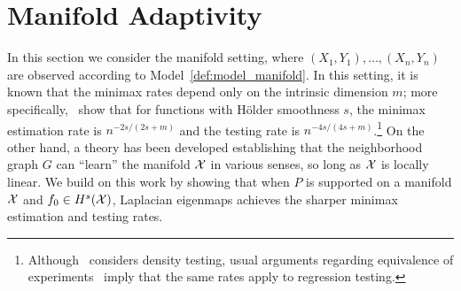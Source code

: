 
\section{Manifold Adaptivity}
\label{sec:manifold_adaptivity}

In this section we consider the manifold setting, where $(X_1,Y_1),\ldots,(X_n,Y_n)$ are observed according to Model~\ref{def:model_manifold}. In this setting, it is known that the minimax rates depend only on the intrinsic dimension $m$; more specifically,~\cite{bickel2007,ariascastro2018} show that for functions with H\"{o}lder smoothness $s$, the minimax estimation rate is $n^{-2s/(2s + m)}$ and the testing rate is $n^{-4s/(4s + m)}$.\footnote{Although~\cite{ariascastro2018} considers density testing, usual arguments regarding equivalence of experiments~\citep{brown96} imply that the same rates apply to regression testing.} On the other hand, a theory has been developed \citep{niyogi2008finding,belkin03,belkin05,niyogi2013,balakrishnan2012minimax,balakrishnan2013cluster} establishing that the neighborhood graph $G$ can ``learn'' the manifold $\mathcal{X}$ in various senses, so long as $\mathcal{X}$ is locally linear.  We build on this work by showing that when $P$ is supported on a manifold $\mathcal{X}$ and $f_0 \in H^s(\mathcal{X})$, Laplacian eigenmaps achieves the sharper minimax estimation and testing rates.

